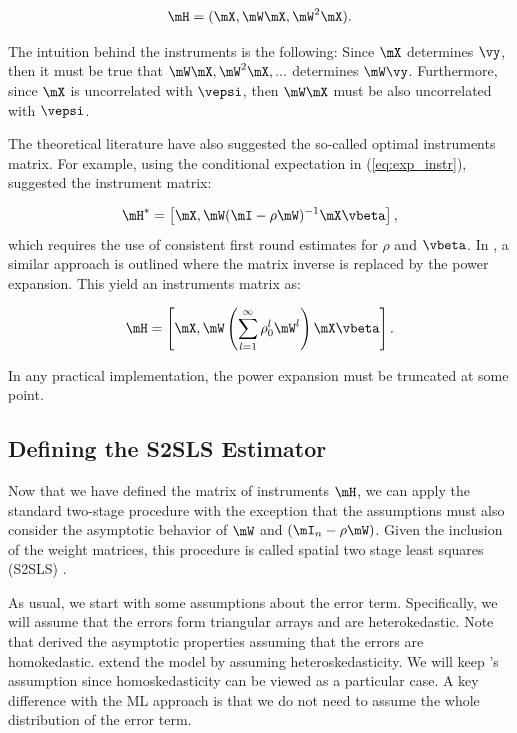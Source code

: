 \documentclass[english,12pt]{book}\usepackage[]{graphicx}\usepackage[]{xcolor}
\begin{document}
\begin{equation*}
  \mH = (\mX, \mW\mX, \mW^2\mX).
\end{equation*}

\begin{remark}
The intuition behind the instruments is the following: Since $\mX$ determines $\vy$, then it must be true that $\mW\mX, \mW^2\mX, ...$ determines $\mW\vy$. Furthermore, since $\mX$ is uncorrelated with $\vepsi$, then $\mW\mX$ must be also uncorrelated with $\vepsi$.
\end{remark}

The theoretical literature have also suggested the so-called optimal instruments matrix. For example, using the conditional expectation in (\ref{eq:exp_instr}), \cite{lee2003best} suggested the instrument matrix:

\begin{equation*}
\mH^* =\left[\mX, \mW(\mI - \rho\mW)^{-1}\mX\vbeta\right],
\end{equation*}
%
which requires the use of consistent first round estimates for $\rho$ and $\vbeta$.  In \cite{Keliejian2004}, a similar approach is outlined where the matrix inverse is replaced by the power expansion. This yield an instruments matrix as:

\begin{equation*}
\mH =\left[\mX, \mW\left(\sum_{l = 1}^{\infty}\rho_0^{l}\mW^l\right)\mX\vbeta\right].
\end{equation*}

In any practical implementation, the power expansion must be truncated at some point. 

\subsection{Defining the S2SLS Estimator}

Now that we have defined the matrix of instruments $\mH$, we can apply the standard two-stage procedure with the exception that the assumptions must also consider the asymptotic behavior of $\mW$ and $(\mI_n - \rho\mW)$. Given the inclusion of the weight matrices, this procedure is called spatial two stage least squares (S2SLS) \citep{kelejian1998generalized}. 

As usual, we start with some assumptions about the error term. Specifically, we will assume that the errors form triangular arrays and are heterokedastic. Note that \cite{kelejian1998generalized} derived the asymptotic properties assuming that the errors are homokedastic. \cite{kelejian2010specification} extend the model by assuming heteroskedasticity. We will keep \cite{kelejian2010specification}'s assumption since homoskedasticity can be viewed as a particular case. A key difference with the ML approach is that we do not need to assume the whole distribution of the error term. 
\end{document}
